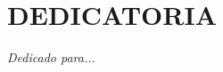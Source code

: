 
\chapter*{\hfill DEDICATORIA}
\thispagestyle{empty} %

\doublespacing

\begin{flushright}
    \textit{Dedicado para...}
\end{flushright}

\restoregeometry
